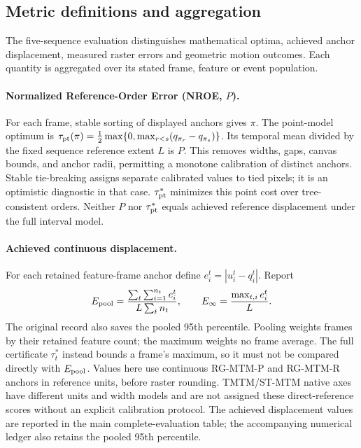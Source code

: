 \subsection{Metric definitions and aggregation}\label{sec:metric_protocol}
The five-sequence evaluation distinguishes mathematical optima, achieved anchor displacement, measured raster errors and geometric motion outcomes. Each quantity is aggregated over its stated frame, feature or event population.

\paragraph{Normalized Reference-Order Error (NROE, $P$).}
For each frame, stable sorting of displayed anchors gives $\pi$. The point-model optimum is $\tau_{\rm pt}(\pi)=\frac12\max\{0,\max_{r<s}(q_{\pi_r}-q_{\pi_s})\}$. Its temporal mean divided by the fixed sequence reference extent $L$ is $P$. This removes widths, gaps, canvas bounds, and anchor radii, permitting a monotone calibration of distinct anchors. Stable tie-breaking assigns separate calibrated values to tied pixels; it is an optimistic diagnostic in that case. $\tau^*_{\rm pt}$ minimizes this point cost over tree-consistent orders. Neither $P$ nor $\tau^*_{\rm pt}$ equals achieved reference displacement under the full interval model.

\paragraph{Achieved continuous displacement.}
For each retained feature-frame anchor define $e_i^t=|u_i^t-q_i^t|$. Report
\[
 E_{\rm pool}=\frac{\sum_t\sum_{i=1}^{n_t}e_i^t}{L\sum_tn_t},\qquad
 E_\infty=\frac{\max_{t,i}e_i^t}{L}.
\]
The original record also saves the pooled 95th percentile. Pooling weights frames by their retained feature count; the maximum weights no frame average. The full certificate $\tau_t^*$ instead bounds a frame's maximum, so it must not be compared directly with $E_{\rm pool}$. Values here use continuous RG-MTM-P and RG-MTM-R anchors in reference units, before raster rounding. TMTM/ST-MTM native axes have different units and width models and are not assigned these direct-reference scores without an explicit calibration protocol.
The achieved displacement values are reported in the main complete-evaluation table; the accompanying numerical ledger also retains the pooled 95th percentile.

